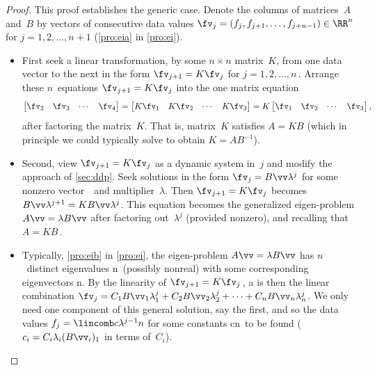 \begin{proof} 
This proof establishes the generic case.
Denote the columns of matrices~\(A\) and~\(B\) by vectors of consecutive data values \(\fv_j=(f_j, f_{j+1},\ldots,f_{j+n-1})\in\RR^n\) for \(j=1,2,\ldots,n+1\) (\cref{pro:eia} in \cref{pro:ei}).
\begin{itemize}
\item First seek a linear transformation, by some \(n\times n\) matrix~\(K\), from one data vector to the next in the form \(\fv_{j+1}=K\fv_j\) for \(j=1,2,\ldots,n\)\,.
Arrange these \(n\)~equations \(\fv_{j+1}=K\fv_j\) into the one matrix equation
\begin{equation*}
\begin{bmatrix} \fv_2&\fv_3&\cdots&\fv_4 \end{bmatrix}
=\begin{bmatrix} K\fv_1&K\fv_2&\cdots&K\fv_3 \end{bmatrix}
=K\begin{bmatrix} \fv_1&\fv_2&\cdots&\fv_3 \end{bmatrix},
\end{equation*}
after factoring the matrix~\(K\).
That is, matrix~\(K\) satisfies \(A=KB\) (which in principle we could typically solve to obtain \(K=AB^{-1}\)).

\item Second, view \(\fv_{j+1}=K\fv_j\) as a dynamic system in~\(j\) and modify the approach of \cref{sec:ddp}.
Seek solutions in the form \(\fv_j=B\vv \lambda^j\) for some nonzero vector~\vv\ and multiplier~\(\lambda\).
Then \(\fv_{j+1}=K\fv_j\) becomes \(B\vv \lambda^{j+1}=KB\vv \lambda^j\).
This equation becomes the generalized eigen-problem \(A\vv=\lambda B\vv\) after factoring out~\(\lambda^j\) (provided nonzero), and recalling that \(A=KB\)\,.

\item Typically, \cref{pro:eib} in \cref{pro:ei}, the eigen-problem \(A\vv=\lambda B\vv\) has \(n\)~distinct eigenvalues \hlist\lambda n\ (possibly nonreal) with some corresponding eigenvectors \hlist\vv n.
By the linearity of \(\fv_{j+1}=K\fv_j\)\,, a  is then the linear combination \(\fv_j=C_1B\vv_1\lambda_1^{j} +C_2B\vv_2\lambda_2^{j} +\cdots +C_nB\vv_n\lambda_n^{j}\).
We only need one component of this general solution, say the first, and so the data values \(f_j=\lincomb c{\lambda^{j-1}}n\) for some constants \hlist cn\ to be found (\(c_i=C_i\lambda_i(B\vv_i)_1\) in terms of~\(C_i\)).


\end{itemize}
\end{proof}
